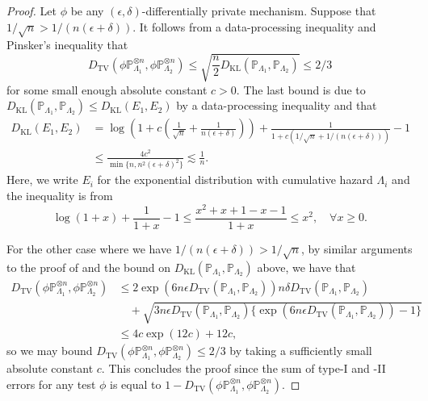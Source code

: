 \documentclass[11pt]{article}
\begin{document}
\begin{proof}
Let $\phi$ be any $(\epsilon, \delta)$-differentially private mechanism. Suppose that $1/\sqrt{n} > 1/(n(\epsilon+\delta))$. It follows from a data-processing inequality and Pinsker's inequality that  
\begin{equation*}
    D_{\mathrm{TV}}\left(\phi\mathbb{P}_{\Lambda_1}^{\otimes n}, \phi\mathbb{P}_{\Lambda_2}^{\otimes n} \right) \leq  \sqrt{\frac{n}{2} D_{\mathrm{KL}}(\mathbb{P}_{\Lambda_1}, \mathbb{P}_{\Lambda_2})} \leq 2/3
\end{equation*}
for some small enough absolute constant $c>0$. The last bound is due to $D_{\mathrm{KL}}(\mathbb{P}_{\Lambda_1}, \mathbb{P}_{\Lambda_2}) \leq D_{\mathrm{KL}}(E_1, E_2)$ by a data-processing inequality and that
\begin{align*}
    D_{\mathrm{KL}}(E_1, E_2) &= \log\left( 1 + c \left(\frac{1}{\sqrt{n}} + \frac{1}{n (\epsilon+\delta)} \right) \right) + \frac{1}{1 + c(1/\sqrt{n} + 1/(n (\epsilon+\delta)))} - 1 \\
    &\leq \frac{4c^2}{ \min\{n, n^2 (\epsilon + \delta)^2\}} \lesssim \frac{1}{n}.
\end{align*}
Here, we write $E_i$ for the exponential distribution with cumulative hazard $\Lambda_i$ and the inequality is from 
\begin{equation*}
    \log(1+x) + \frac{1}{1+x} - 1 \leq \frac{x^2 + x + 1 - x - 1}{1+x} \leq x^2, \quad \forall x \geq 0.
\end{equation*}


For the other case where we have $1/(n(\epsilon+\delta)) > 1/\sqrt{n}$, by similar arguments to the proof of  and the bound on $D_{\mathrm{KL}}(\mathbb{P}_{\Lambda_1}, \mathbb{P}_{\Lambda_2})$ above, we have that 
\begin{align*}
    D_{\mathrm{TV}}(\phi \mathbb{P}_{\Lambda_1}^{\otimes n}, \phi\mathbb{P}_{\Lambda_2}^{\otimes n}) &\leq 2\exp(6n \epsilon D_{\mathrm{TV}}(\mathbb{P}_{\Lambda_1}, \mathbb{P}_{\Lambda_2})) n\delta D_{\mathrm{TV}}(\mathbb{P}_{\Lambda_1}, \mathbb{P}_{\Lambda_2}) \\
    &\quad+  \sqrt{3n \epsilon D_{\mathrm{TV}}(\mathbb{P}_{\Lambda_1}, \mathbb{P}_{\Lambda_2})\{\exp( 6n \epsilon D_{\mathrm{TV}}(\mathbb{P}_{\Lambda_1}, \mathbb{P}_{\Lambda_2})) - 1\}} \\
    &\leq 4 c \exp(12 c) + 12c,
\end{align*}
so we may bound $D_{\mathrm{TV}}(\phi \mathbb{P}_{\Lambda_1}^{\otimes n}, \phi \mathbb{P}_{\Lambda_2}^{\otimes n}) \leq 2/3$ by taking a sufficiently small absolute constant $c$. This concludes the proof since the sum of type-I and -II errors for any test $\phi$ is equal to $1- D_{\mathrm{TV}}(\phi \mathbb{P}_{\Lambda_1}^{\otimes n}, \phi \mathbb{P}_{\Lambda_2}^{\otimes n})$.
\end{proof}
\end{document}
